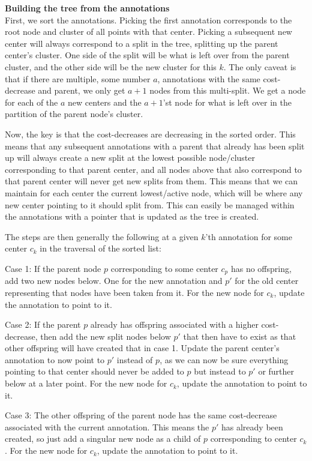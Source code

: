\textbf{Building the tree from the annotations}\\
First, we sort the annotations. Picking the first annotation corresponds to the root node and cluster of all points with that center. Picking a subsequent new center will always correspond to a split in the tree, splitting up the parent center's cluster. One side of the split will be what is left over from the parent cluster, and the other side will be the new cluster for this $k$. The only caveat is that if there are multiple, some number $a$, annotations with the same cost-decrease and parent, we only get $a+1$ nodes from this multi-split. We get a node for each of the $a$ new centers and the $a+1$'st node for what is left over in the partition of the parent node's cluster. 

Now, the key is that the cost-decreases are decreasing in the sorted order. This means that any subsequent annotations with a parent that already has been split up will always create a new split at the lowest possible node/cluster corresponding to that parent center, and all nodes above that also correspond to that parent center will never get new splits from them. This means that we can maintain for each center the current lowest/active node, which will be where any new center pointing to it should split from. This can easily be managed within the annotations with a pointer that is updated as the tree is created. 

The steps are then generally the following at a given $k$'th annotation for some center $c_k$ in the traversal of the sorted list:

Case 1: If the parent node $p$ corresponding to some center $c_p$ has no offspring, add two new nodes below. One for the new annotation and $p'$ for the old center representing that nodes have been taken from it. For the new node for $c_k$, update the annotation to point to it.  

Case 2: If the parent $p$ already has offspring associated with a higher cost-decrease, then add the new split nodes below $p'$  that then have to exist as that other offspring will have created that in case 1. Update the parent center's annotation to now point to $p'$ instead of $p$, as we can now be sure everything pointing to that center should never be added to $p$ but instead to $p'$ or further below at a later point. For the new node for $c_k$, update the annotation to point to it. 

Case 3: The other offspring of the parent node has the same cost-decrease associated with the current annotation. This means the $p'$ has already been created, so just add a singular new node as a child of $p$ corresponding to center $c_k$. For the new node for $c_k$, update the annotation to point to it. 



